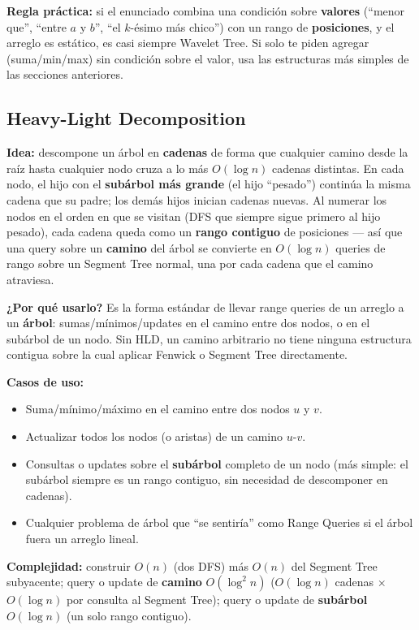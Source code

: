 \documentclass[10pt,a4paper,twocolumn]{article}
\begin{document}
\textbf{Regla práctica:} si el enunciado combina una condición sobre
\textbf{valores} (``menor que'', ``entre $a$ y $b$'', ``el $k$-ésimo
más chico'') con un rango de \textbf{posiciones}, y el arreglo es
estático, es casi siempre Wavelet Tree. Si solo te piden agregar
(suma/min/max) sin condición sobre el valor, usa las estructuras más
simples de las secciones anteriores.


\subsection{Heavy-Light Decomposition}

\textbf{Idea:} descompone un árbol en \textbf{cadenas} de forma que
cualquier camino desde la raíz hasta cualquier nodo cruza a lo más
$O(\log n)$ cadenas distintas. En cada nodo, el hijo con el
\textbf{subárbol más grande} (el hijo ``pesado'') continúa la misma
cadena que su padre; los demás hijos inician cadenas nuevas. Al
numerar los nodos en el orden en que se visitan (DFS que siempre
sigue primero al hijo pesado), cada cadena queda como un \textbf{rango
contiguo} de posiciones — así que una query sobre un \textbf{camino}
del árbol se convierte en $O(\log n)$ queries de rango sobre un
Segment Tree normal, una por cada cadena que el camino atraviesa.

\textbf{¿Por qué usarlo?} Es la forma estándar de llevar range
queries de un arreglo a un \textbf{árbol}: sumas/mínimos/updates en
el camino entre dos nodos, o en el subárbol de un nodo. Sin HLD, un
camino arbitrario no tiene ninguna estructura contigua sobre la cual
aplicar Fenwick o Segment Tree directamente.

\textbf{Casos de uso:}

\begin{itemize}
    \item Suma/mínimo/máximo en el camino entre dos nodos $u$ y $v$.
    \item Actualizar todos los nodos (o aristas) de un camino $u$-$v$.
    \item Consultas o updates sobre el \textbf{subárbol} completo de un
    nodo (más simple: el subárbol siempre es un rango contiguo, sin
    necesidad de descomponer en cadenas).
    \item Cualquier problema de árbol que ``se sentiría'' como Range
    Queries si el árbol fuera un arreglo lineal.
\end{itemize}

\textbf{Complejidad:} construir $O(n)$ (dos DFS) más $O(n)$ del
Segment Tree subyacente; query o update de \textbf{camino}
$O(\log^2 n)$ ($O(\log n)$ cadenas $\times$ $O(\log n)$ por consulta
al Segment Tree); query o update de \textbf{subárbol} $O(\log n)$
(un solo rango contiguo).
\end{document}
